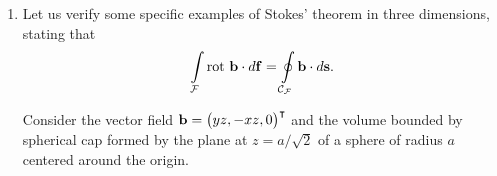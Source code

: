 {\begin{enumerate}
\begin{eqnarray*}
\begin{array}{rcl}
        \int \sin^3 \varphi \, d\varphi & = & -\cos \varphi+
          \frac{1}{3} \cos^3 \varphi
      \end{array}
    \Biggr] \, = \\
    & = & 3 \cdot 16
    \left\{
      \frac{2 \pi}{2}-
      \underbrace
        {\left[
          \left(1+\frac{1}{3}\right)-\left(1+\frac{1}{3}\right)
        \right]}
      _{=0}
    \right\}=48 \pi
\end{eqnarray*}
For the flux through the surfaces one thus obtains
$$ \oint \limits_F {\bf w} \cdot d{\bf f}=F_1+F_2+F_3=84 \pi .$$





\item
Let us verify  some specific examples of Stokes' theorem in three dimensions,
stating that
\begin{equation}
\int \limits_{\cal F} \textrm{rot } {\bf b} \cdot d{\bf f}   =\oint \limits_{{\cal C}_{\cal F}} {\bf b} \cdot d{\bf s}
.   \label{2011-m-stokes}
\end{equation}

Consider the vector field ${\bf b} = \begin{pmatrix} yz , -xz , 0 \end{pmatrix}^\intercal $
and the volume bounded by spherical cap
formed by the plane at $z = a / \sqrt{2}$ of a sphere of radius $a$ centered around the origin.


\end{enumerate}}
